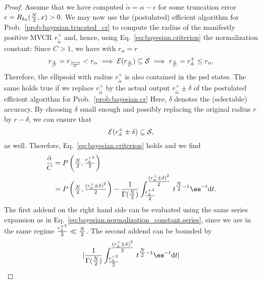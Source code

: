 \begin{proof}
  Assume that we have computed $\tilde\alpha = \alpha-\epsilon$ for some truncation error $\epsilon = R_{k_0}(\tfrac{N}{2},x) > 0$.
  We may now use the (postulated) efficient algorithm for Prob.~\ref{prob:bayesian.trucated_cr} to compute the radius of the manifestly positive MVCR $r^+_{\tilde\alpha}$ and, hence, using Eq.~\eqref{eq:bayesian.criterion} the normalization constant:
  Since $C>1$, we have with $r_{\alpha} = r$
  \begin{equation}
    r_\frac{\tilde\alpha}{C} = r_\frac{\alpha-\epsilon}{C} < r_{\alpha} \implies \mathcal{E}(r_\frac{\tilde\alpha}{C}) \subseteq \mathcal{S} \implies r_\frac{\tilde\alpha}{C} = r^+_{\tilde\alpha} \le r_{\alpha}.
  \end{equation}
  Therefore, the ellipsoid with radius $r^+_{\tilde\alpha}$ is also contained in the psd states.
  The same holds true if we replace $r^+_{\tilde\alpha}$ by the actual output $r^+_{\tilde\alpha} \pm \delta$ of the postulated efficient algorithm for Prob.~\ref{prob:bayesian.cr}
  Here, $\delta$ denotes the (selectable) accuracy.
  By choosing $\delta$ small enough and possibly replacing the original radius $r$ by $r - \delta$, we can ensure that
  \begin{equation}
    \label{eq:bayesian.normalization_constant.small_enough_r}
    \mathcal{E}(r^+_{\tilde\alpha} \pm \delta) \subseteq \mathcal{S},
  \end{equation}
  as well.
  Therefore, Eq.~\eqref{eq:bayesian.criterion} holds and we find
  \begin{align}
    \label{eq:bayesian.normalization_constant.almost_c}
    \frac{\tilde\alpha}{C}
    &= P\left( \Nhalf, \tfrac{{r^+_{\tilde\alpha}}^2}{2} \right) \\
    &= P\left( \Nhalf, \tfrac{{(r^+_{\tilde\alpha} \pm \delta)}^2}{2} \right) - \frac{1}{\Gamma(\Nhalf)} \int_{\tfrac{{r^+_{\tilde\alpha}}^2}{2}}^{\tfrac{{(r^+_{\tilde\alpha} \pm \delta)}^2}{2}}\, t^{\Nhalf - 1} \ee^{-t} \dd t.
  \end{align}
  The first addend on the right hand side can be evaluated using the same series expansion as in Eq.~\eqref{eq:bayesian.normalization_constant.series}, since we are in the same regime $\tfrac{{r^+_{\tilde\alpha}}^2}{2} \ll \tfrac{N}{2}$.
  The second addend can be bounded by
  \begin{equation}
    \label{eq:bayesian.normalization_constant.upper_bound}
    \abs{\frac{1}{\Gamma(\Nhalf)} \int_{\tfrac{{r^+_{\tilde\alpha}}^2}{2}}^{\tfrac{{(r^+_{\tilde\alpha} \pm \delta)}^2}{2}}\, t^{\Nhalf - 1} \ee^{-t} \dd t}

\end{equation}
\end{proof}
